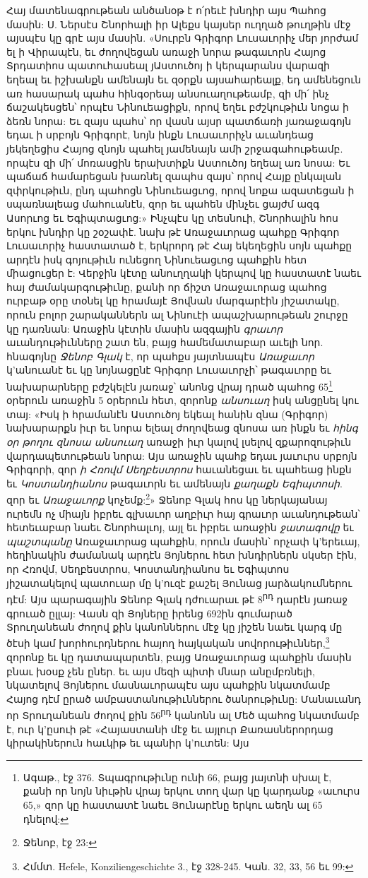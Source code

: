 \documentclass{article}
\begin{document}
{Հայ մատենագրութեան անծանօթ է ո՛րեւէ խնդիր այս Պահոց մասին: Ս. Ներսէս Շնորհալի իր Ալեքս կայսեր ուղղած թուղթին մէջ այսպէս կը գրէ այս մասին. «Սուրբն Գրիգոր Լուսաւորիչ մեր յորժամ ել ի Վիրապէն, եւ ժողովեցան առաջի նորա թագաւորն Հայոց Տրդատիոս պատուհասեալ յԱստուծոյ ի կերպարանս վարազի եղեալ եւ իշխանքն ամենայն եւ զօրքն այսահարեալք, եդ ամենեցուն առ հասարակ պահս հինգօրեայ անսուաղութեամբ, զի մի՛ ինչ ճաշակեսցեն՝ որպէս Նինուեացիքն, որով եղեւ բժշկութիւն նոցա ի ձեռն նորա: Եւ զայս պահս՝ որ վասն այսր պատճառի յառաջագոյն եդաւ ի սրբոյն Գրիգորէ, նոյն ինքն Լուսաւորիչն աւանդեաց յեկեղեցիս Հայոց զնոյն պահել յամենայն ամի շրջագահութեամբ. որպէս զի մի՛ մոռասցին երախտիքն Աստուծոյ եղեալ առ նոսա: Եւ պաճաճ համարեցան խառնել զապհս զայս՝ որով Հայք ընկալան զփրկութիւն, ընդ պահոցն Նինուեացւոց, որով նոքա ազատեցան ի սպառնալեաց մահուանէն, զոր եւ պահեն մինչեւ ցայժմ ազգ Ասորւոց եւ Եգիպտացւոց:» Ինչպէս կը տեսնուի, Շնորհալին հոս երկու խնդիր կը շօշափէ. նախ թէ Առաջաւորաց պահքը Գրիգոր Լուսաւորիչ հաստատած է, երկրորդ թէ Հայ եկեղեցին սոյն պահքը արդէն իսկ գոյութիւն ունեցող Նինուեացւոց պահքին հետ միացուցեր է: Վերջին կէտը անուղղակի կերպով կը հաստատէ նաեւ հայ ժամակարգութիւնը, քանի որ ճիշտ Առաջաւորաց պահոց ուրբաթ օրը տօնել կը հրամայէ Յովնան մարգարէին յիշատակը, որուն բոլոր շարականներն ալ Նինուէի ապաշխարութեան շուրջը կը դառնան: Առաջին կէտին մասին ազգային \emph{գրաւոր} աւանդութիւնները շատ են, բայց համեմատաբար աւելի նոր. հնագոյնը \emph{Ջենոբ Գլակ} է, որ պահքս յայտնապէս \emph{Առաջաւոր} կ'անուանէ եւ կը նոյնացընէ Գրիգոր Լուսաւորչի՝ թագաւորը եւ նախարարները բժշկելէն յառաջ՝ անոնց վրայ դրած պահոց 65\footnote{Ագաթ., էջ 376. Տպագրութիւնը ունի 66, բայց յայտնի սխալ է, քանի որ նոյն նիւթին վրայ երկու տող վար կը կարդանք «աւուրս 65,» զոր կը հաստատէ նաեւ Յունարէնը երկու աեղն ալ 65 դնելով:} օրերուն առաջին 5 օրերուն հետ, զորոնք \emph{անսուաղ} իսկ անցընել կու տայ: «Իսկ ի հրամանէն Աստուծոյ եկեալ հանին զնա (Գրիգոր) նախարարքն իւր եւ նորա ելեալ ժողովեաց զնոսա առ ինքն եւ \emph{հինգ օր թողու զնոսա անսուաղ} առաջի իւր կալով լսելով զքարոզութիւն վարդապետութեան նորա: Այս առաջին պահք եդաւ յաւուրս սրբոյն Գրիգորի, զոր \emph{ի Հռովմ Սեղբեստրոս} հաւանեցաւ եւ պահեաց ինքն եւ \emph{Կոստանդիանոս} թագաւորն եւ ամենայն \emph{քաղաքն Եգիպտոսի}. զոր եւ \emph{Առաջաւորք} կոչեմք:\footnote{Ջենոբ, էջ 23:}» Ջենոբ Գլակ հոս կը ներկայանայ ուրեմն ոչ միայն իբրեւ գլխաւոր աղբիւր հայ գրաւոր աւանդութեան՝ հետեւաբար նաեւ Շնորհալւոյ, այլ եւ իբրեւ առաջին \emph{ջատագովը} եւ \emph{պաշտպանը} Առաջաւորաց պահքին, որուն մասին՝ որչափ կ'երեւայ, հեղինակին ժամանակ արդէն Յոյներու հետ խնդիրներն սկսեր էին, որ Հռովմ, Սեղբեստրոս, Կոստանդիանոս եւ Եգիպտոս յիշատակելով պատուար մը կ'ուզէ քաշել Յունաց յարձակումներու դէմ: Այս պարագային Ջենոբ Գլակ դժուարաւ թէ 8\textsuperscript{րդ} դարէն յառաջ գրուած ըլլայ: Վասն զի Յոյները իրենց 692ին գումարած Տրուղանեան ժողով քին կանոններու մէջ կը յիշեն նաեւ կարգ մը ծէսի կամ խորհուրդներու հայող հայկական սովորութիւններ,\footnote{Հմմտ. Hefele, Konziliengeschichte 3., էջ 328-245. Կան. 32, 33, 56 եւ 99:} զորոնք եւ կը դատապարտեն, բայց Առաջաւորաց պահքին մասին բնաւ խօսք չեն ըներ. եւ այս մեզի պիտի մնար անըմբռնելի, նկատելով Յոյներու մասնաւորապէս այս պահքին նկատմամբ Հայոց դէմ ըրած ամբաստանութիւններու ծանրութիւնը: Մանաւանդ որ Տրուղանեան ժողով քին 56\textsuperscript{րդ} կանոնն ալ Մեծ պահոց նկատմամբ է, ուր կ'ըսուի թէ «Հայաստանի մէջ եւ այլուր Քառասներորդաց կիրակիներուն հաւկիթ եւ պանիր կ'ուտեն: Այս }
\end{document}
